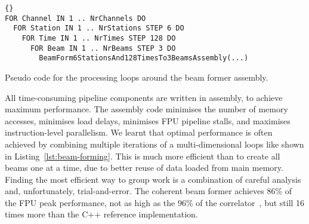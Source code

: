 \documentclass{llncs}
\begin{document}

\begin{listing}
\lstset{language=pseudo}
\begin{lstlisting}{}
FOR Channel IN 1 .. NrChannels DO
  FOR Station IN 1 .. NrStations STEP 6 DO
    FOR Time IN 1 .. NrTimes STEP 128 DO
      FOR Beam IN 1 .. NrBeams STEP 3 DO
        BeamForm6StationsAnd128TimesTo3BeamsAssembly(...)
\end{lstlisting}
\caption{Pseudo code for the processing loops around the beam former assembly.}
\label{lst:beam-forming}
\end{listing}        

All time-consuming pipeline components are written in assembly, to achieve maximum performance.  The assembly code minimises the number of memory accesses, minimises load delays, minimises FPU pipeline stalls, and maximises instruction-level parallelism.  We learnt that optimal performance is often achieved by combining multiple iterations of a multi-dimensional loops like shown in Listing~\ref{lst:beam-forming}. This is much more efficient than to create all beams one at a time, due to better reuse of data loaded from main memory.  Finding the most efficient way to group work is a combination of careful analysis and, unfortunately, trial-and-error. The coherent beam former achieves 86\% of the FPU peak performance, not as high as the 96\% of the correlator~\cite{Romein:10a}, but still 16 times more than the C++ reference implementation. 
\end{document}

